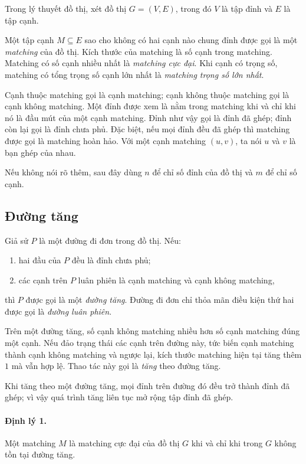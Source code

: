 \documentclass[11pt]{article}
\begin{document}
Trong lý thuyết đồ thị, xét đồ thị \(G=(V,E)\), trong đó \(V\) là tập đỉnh và
\(E\) là tập cạnh.

Một tập cạnh \(M\subseteq E\) sao cho không có hai cạnh nào chung đỉnh được gọi
là một \emph{matching} của đồ thị. Kích thước của matching là số cạnh trong
matching. Matching có số cạnh nhiều nhất là \emph{matching cực đại}. Khi cạnh có
trọng số, matching có tổng trọng số cạnh lớn nhất là \emph{matching trọng số lớn
nhất}.

Cạnh thuộc matching gọi là cạnh matching; cạnh không thuộc matching gọi là cạnh
không matching. Một đỉnh được xem là nằm trong matching khi và chỉ khi nó là đầu
mút của một cạnh matching. Đỉnh như vậy gọi là đỉnh đã ghép; đỉnh còn lại gọi là
đỉnh chưa phủ. Đặc biệt, nếu mọi đỉnh đều đã ghép thì matching được gọi là
matching hoàn hảo. Với một cạnh matching \((u,v)\), ta nói \(u\) và \(v\) là bạn
ghép của nhau.

Nếu không nói rõ thêm, sau đây dùng \(n\) để chỉ số đỉnh của đồ thị và \(m\) để
chỉ số cạnh.

\subsection{Đường tăng}

Giả sử \(P\) là một đường đi đơn trong đồ thị. Nếu:
\begin{enumerate}
  \item hai đầu của \(P\) đều là đỉnh chưa phủ;
  \item các cạnh trên \(P\) luân phiên là cạnh matching và cạnh không matching,
\end{enumerate}
thì \(P\) được gọi là một \emph{đường tăng}. Đường đi đơn chỉ thỏa mãn điều kiện
thứ hai được gọi là \emph{đường luân phiên}.

Trên một đường tăng, số cạnh không matching nhiều hơn số cạnh matching đúng một
cạnh. Nếu đảo trạng thái các cạnh trên đường này, tức biến cạnh matching thành
cạnh không matching và ngược lại, kích thước matching hiện tại tăng thêm \(1\)
mà vẫn hợp lệ. Thao tác này gọi là \emph{tăng} theo đường tăng.

Khi tăng theo một đường tăng, mọi đỉnh trên đường đó đều trở thành đỉnh đã ghép;
vì vậy quá trình tăng liên tục mở rộng tập đỉnh đã ghép.

\paragraph{Định lý 1.}
Một matching \(M\) là matching cực đại của đồ thị \(G\) khi và chỉ khi trong
\(G\) không tồn tại đường tăng.
\end{document}

